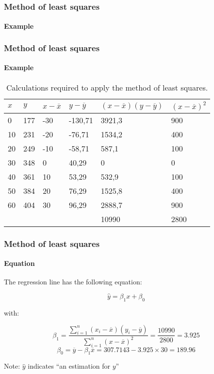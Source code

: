 \documentclass[aspectratio=169]{beamer}
\begin{document}
\begin{frame}
  \frametitle{Method of least squares}
  \framesubtitle{Example}
  
  \centering
\end{frame}

\begin{frame}
  \frametitle{Method of least squares}
  \framesubtitle{Example}
  
  \begin{table}[h] \centering \footnotesize
    \begin{tabular}{@{}llllll@{}}
      \toprule
      $x$   & $y$     & $x-\overline{x}$    & $y - \overline{y}$        & $(x-\overline{x})(y - \overline{y})$       &  $(x-\overline{x})^{2}$    \\ \midrule
      0  & 177 & -30 & -130,71 & 3921,3 & 900  \\
      10 & 231 & -20 & -76,71  & 1534,2 & 400  \\
      20 & 249 & -10 & -58,71  & 587,1  & 100  \\
      30 & 348 & 0   & 40,29   & 0      & 0    \\
      40 & 361 & 10  & 53,29   & 532,9  & 100  \\
      50 & 384 & 20  & 76,29   & 1525,8 & 400  \\
      60 & 404 & 30  & 96,29   & 2888,7 & 900  \\
      &     &     &         & 10990  & 2800 \\ \bottomrule
    \end{tabular}
    \caption{Calculations required to apply the method of least squares.}
    \label{tab:rendieren2}
  \end{table}
\end{frame}

\begin{frame}
  \frametitle{Method of least squares}
  \framesubtitle{Equation}
  
  The regression line has the following equation:
  
  \[ \hat{y} = \beta_1 x + \beta_0 \]
  
  with:
  
  \[ \beta_{1} = \frac{\sum_{i=1}^{n} (x_{i}-\overline{x})(y_{i} - \overline{y})}{\sum_{i=1}^{n} (x-\overline{x})^{2}} = \frac{10990}{2800} = 3.925 \]
  \[ \beta_{0} = \overline{y} - \beta_{1} \overline{x} = 307.7143 - 3.925 \times 30 = 189.96 \]
  
  Note: $\hat{y}$ indicates ``an estimation for $y$''
\end{frame}
\end{document}
